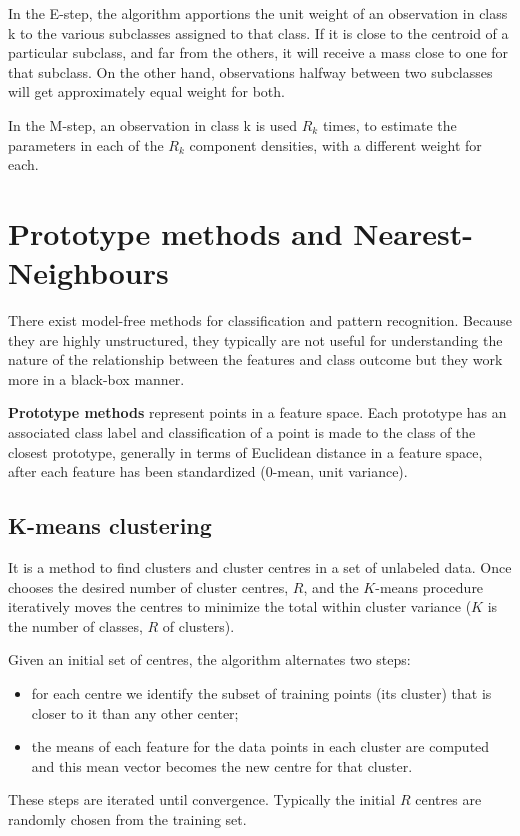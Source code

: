 \documentclass[12pt, letterpaper]{article}
\theoremstyle{definition}
\begin{document}
In the E-step, the algorithm apportions the unit weight of an observation in class k to the various subclasses assigned to that class. If it is close to the centroid of a particular subclass, and far from the others, it will receive a mass close to one for that subclass. On the other hand, observations halfway between two subclasses will get approximately equal weight for both.

In the M-step, an observation in class k is used $R_k$ times, to estimate the parameters in each of the $R_k$ component densities, with a different weight for each. 

\section{Prototype methods and Nearest-Neighbours}
There exist model-free methods for classification and pattern recognition. Because they are highly unstructured, they typically are not useful for understanding the nature of the relationship between the features and class outcome but they work more in a black-box manner.

\textbf{Prototype methods} represent points in a feature space. Each prototype has an associated class label and classification of a point is made to the class of the closest prototype, generally in terms of Euclidean distance in a feature space, after each feature has been standardized (0-mean, unit variance).

\subsection{K-means clustering}
It is a method to find clusters and cluster centres in a set of unlabeled data. Once chooses the desired number of cluster centres, $R$, and the $K$-means procedure iteratively moves the centres to minimize the total within cluster variance ($K$ is the number of classes, $R$ of clusters).

Given an initial set of centres, the algorithm alternates two steps:
\begin{itemize}
\item for each centre we identify the subset of training points (its cluster) that is closer to it than any other center;
\item the means of each feature for the data points in each cluster are computed and this mean vector becomes the new centre for that cluster.
\end{itemize}
These steps are iterated until convergence. Typically the initial $R$ centres are randomly chosen from the training set.
\end{document}
